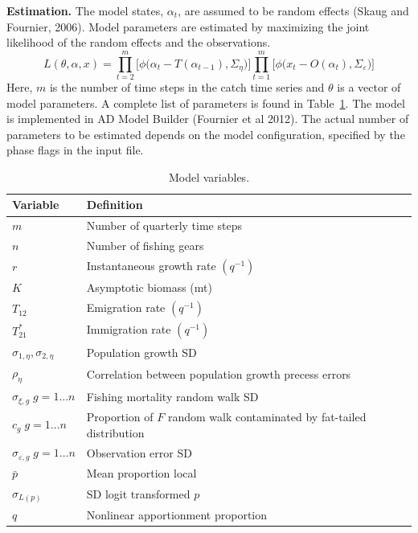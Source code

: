 \documentclass[12pt,letterpaper]{article}
\begin{document}
{\bf Estimation.} The model states, $\alpha_t$, are assumed to be random
effects (Skaug and Fournier, 2006). Model parameters are estimated by
maximizing the joint likelihood of the random
effects and the observations.
\begin{equation}
L(\theta,\alpha,x)=
\prod^m_{t=2}\big[\phi\big(\alpha_t-T(\alpha_{t-1}), \Sigma_\eta\big)\big]
\prod^m_{t=1}\big[\phi\big(x_t-O(\alpha_t), \Sigma_\varepsilon\big)\big]
\end{equation}
Here, $m$ is the number of time steps in the catch time series and
$\theta$ is a vector of model parameters. A complete list of
parameters is found in Table~\ref{tab:allvars}. 
The model is implemented in AD Model Builder (Fournier et al 2012).
The actual number of
parameters to be estimated depends on the model configuration,
specified by the phase flags in the input file. 

\begin{table}
\caption{Model variables.
\label{tab:allvars}}
\begin{center}
\begin{tabular}{ll}
\hline
Variable & Definition\\
\hline
\hline
$m$ & Number of quarterly time steps\\
$n$ & Number of fishing gears\\
\hline
\hline
$r$ & Instantaneous growth rate $(q^{-1})$\\
$K$ & Asymptotic biomass (mt) \\
$T_{12}$ & Emigration rate $(q^{-1})$\\
$T^*_{21}$& Immigration rate $(q^{-1})$\\
$\sigma_{1,\eta}, \sigma_{2,\eta}$ & Population growth SD\\
$\rho_\eta$ & Correlation between population growth precess errors\\
$\sigma_{\xi,g}\; g=1\ldots n$ & Fishing mortality random walk SD\\
$c_g\; g=1\ldots n$ & Proportion of $F$ random walk contaminated by 
fat-tailed distribution\\
$\sigma_{\varepsilon,g}\; g=1\ldots n$ & Observation error SD \\
$\bar{p}$ & Mean proportion local\\
$\sigma_{L(p)}$ & SD logit transformed $p$\\
$q$ & Nonlinear apportionment proportion\\
\hline
\end{tabular}
\end{center}
\end{table}
\end{document}
